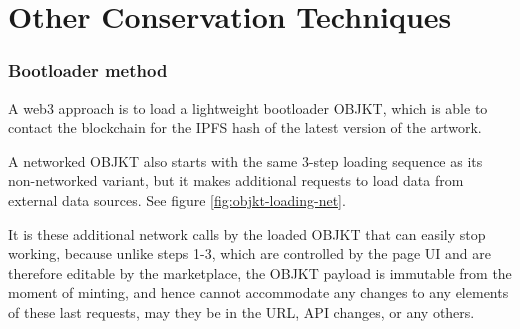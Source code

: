 \chapter{Other Conservation Techniques}


\subsection{Bootloader method}

A web3 approach is to load a lightweight bootloader OBJKT, which is able to contact the blockchain for the IPFS hash of the latest version of the artwork.



A networked OBJKT also starts with the same 3-step loading sequence as its non-networked variant, but it makes additional requests to load data from external data sources. See figure \ref{fig:objkt-loading-net}.



It is these additional network calls by the loaded OBJKT that can easily stop working, because unlike steps 1-3, which are controlled by the page UI and are therefore editable by the marketplace, the OBJKT payload is immutable from the moment of minting, and hence cannot accommodate any changes to any elements of these last requests, may they be in the URL, API changes, or any others.